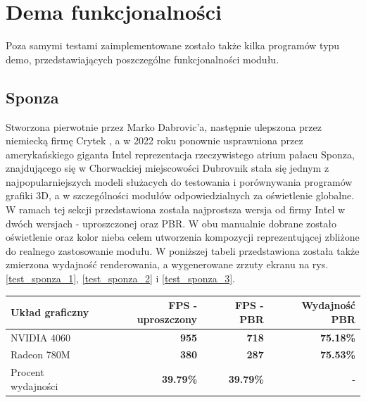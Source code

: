 \chapter{Dema funkcjonalności}
Poza samymi testami zaimplementowane zostało także kilka programów typu demo, przedstawiających poszczególne funkcjonalności modułu.

\section{Sponza}
Stworzona pierwotnie przez Marko Dabrovic'a, następnie ulepszona przez niemiecką firmę Crytek \cite{github:Khronos:Sponza}, a w 2022 roku ponownie usprawniona przez amerykańskiego giganta Intel \cite{Intel:GPUResearch:Sponza} reprezentacja rzeczywistego atrium pałacu Sponza, znajdującego się w Chorwackiej miejscowości Dubrovnik stała się jednym z najpopularniejszych modeli służacych do testowania i porównywania programów grafiki 3D, a w szczególności modułów odpowiedzialnych za oświetlenie globalne. W ramach tej sekcji przedstawiona została najprostsza wersja od firmy Intel w dwóch wersjach - uproszczonej oraz PBR. W obu manualnie dobrane zostało oświetlenie oraz kolor nieba celem utworzenia kompozycji reprezentującej zbliżone do realnego zastosowanie modułu. W poniższej tabeli przedstawiona została także zmierzona wydajność renderowania, a wygenerowane zrzuty ekranu na rys. \ref{test_sponza_1}, \ref{test_sponza_2} i \ref{test_sponza_3}.

\begin{center}
	\begin{tabular}{ |l r r r|}
		\hline
		\textbf{Układ graficzny} & \textbf{FPS - uproszczony} & \textbf{FPS - PBR} & \textbf{Wydajność PBR} \\
		\hline
		NVIDIA 4060 & \textbf{955} & \textbf{718} & \textbf{75.18\%} \\
		Radeon 780M & \textbf{380} & \textbf{287} & \textbf{75.53\%} \\
		Procent wydajności & \textbf{39.79\%} & \textbf{39.79\%} & - \\
		\hline
	\end{tabular}
\end{center}

